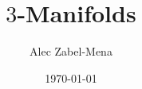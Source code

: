 \documentclass[12pt, twoside]{book}
\title{$3$-Manifolds}
\author{Alec Zabel-Mena}
\date{\today}
\begin{document}
\maketitle
\tableofcontents
\newpage


%
%

\nocite{*}



\end{document}
